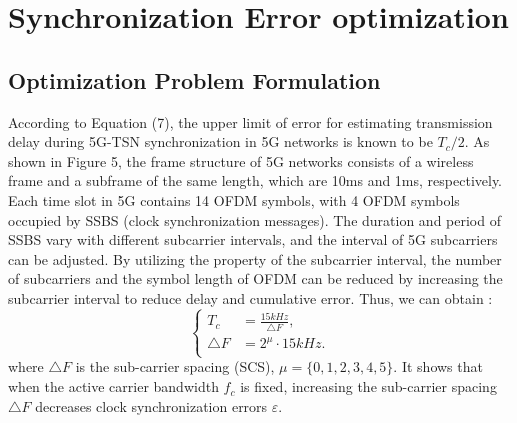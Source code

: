 \documentclass[english]{cccconf}
\begin{document}
\section{Synchronization Error optimization}

\subsection{Optimization Problem Formulation}
According to Equation (7), the upper limit of error for estimating transmission delay during 5G-TSN synchronization in 5G networks is known to be $T_c/2$. As shown in Figure 5, the frame structure of 5G networks consists of a wireless frame and a subframe of the same length, which are 10ms and 1ms, respectively. Each time slot in 5G contains 14 OFDM symbols, with 4 OFDM symbols occupied by SSBS (clock synchronization messages). The duration and period of SSBS vary with different subcarrier intervals, and the interval of 5G subcarriers can be adjusted. By utilizing the property of the subcarrier interval, the number of subcarriers and the symbol length of OFDM can be reduced by increasing the subcarrier interval to reduce delay and cumulative error. Thus, we can obtain :
\begin{equation}
	\left\{
	\begin{aligned}
		T_{c}&=\frac{15kHz}{\triangle F},\\
		\triangle F&=2^\mu\cdot15kHz.\\
	\end{aligned}
     \right.
\end{equation}
where $\triangle F$ is the sub-carrier spacing (SCS), $\mu=\{0,1,2,3,4,5\}$. It shows that when the active carrier bandwidth $f_c$ is fixed, increasing the sub-carrier spacing $\triangle F$ decreases clock synchronization errors $\varepsilon$.
\end{document}
